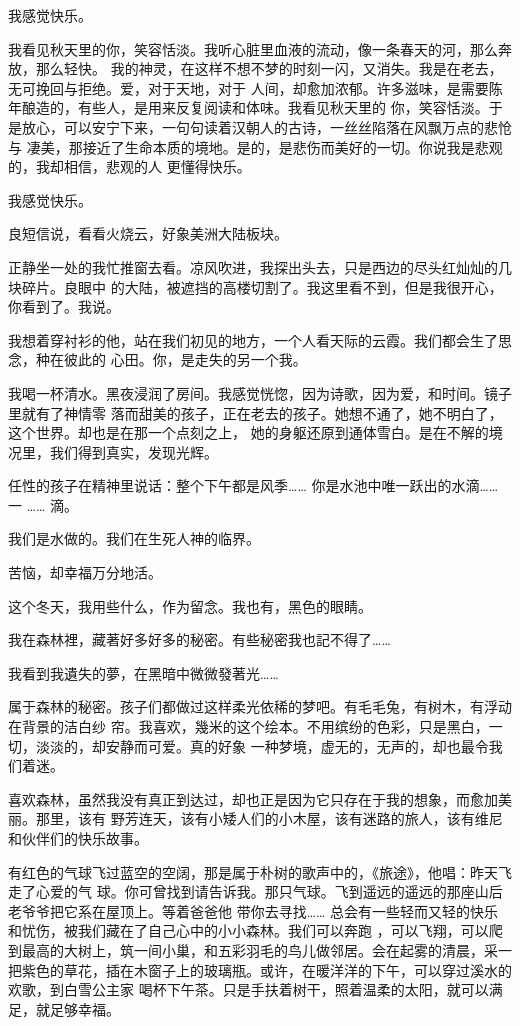 \documentclass[12pt,a4paper]{article}
\begin{document}
		我感觉快乐。

		我看见秋天里的你，笑容恬淡。我听心脏里血液的流动，像一条春天的河，那么奔放，那么轻快。
	我的神灵，在这样不想不梦的时刻一闪，又消失。我是在老去，无可挽回与拒绝。爱，对于天地，对于
	人间，却愈加浓郁。许多滋味，是需要陈年酿造的，有些人，是用来反复阅读和体味。我看见秋天里的
	你，笑容恬淡。于是放心，可以安宁下来，一句句读着汉朝人的古诗，一丝丝陷落在风飘万点的悲怆与
	凄美，那接近了生命本质的境地。是的，是悲伤而美好的一切。你说我是悲观的，我却相信，悲观的人
	更懂得快乐。

		我感觉快乐。

		良短信说，看看火烧云，好象美洲大陆板块。

		正静坐一处的我忙推窗去看。凉风吹进，我探出头去，只是西边的尽头红灿灿的几块碎片。良眼中
	的大陆，被遮挡的高楼切割了。我这里看不到，但是我很开心，你看到了。我说。

		我想着穿衬衫的他，站在我们初见的地方，一个人看天际的云霞。我们都会生了思念，种在彼此的
	心田。你，是走失的另一个我。

		我喝一杯清水。黑夜浸润了房间。我感觉恍惚，因为诗歌，因为爱，和时间。镜子里就有了神情零
	落而甜美的孩子，正在老去的孩子。她想不通了，她不明白了，这个世界。却也是在那一个点刻之上，
	她的身躯还原到通体雪白。是在不解的境况里，我们得到真实，发现光辉。

		任性的孩子在精神里说话：整个下午都是风季…… 你是水池中唯一跃出的水滴…… 一 …… 滴。

		我们是水做的。我们在生死人神的临界。

		苦恼，却幸福万分地活。

		这个冬天，我用些什么，作为留念。我也有，黑色的眼睛。

	\endwriting



		我在森林裡，藏著好多好多的秘密。有些秘密我也記不得了……

		我看到我遺失的夢，在黑暗中微微發著光……


		属于森林的秘密。孩子们都做过这样柔光依稀的梦吧。有毛毛兔，有树木，有浮动在背景的洁白纱
	帘。我喜欢，幾米的这个绘本。不用缤纷的色彩，只是黑白，一切，淡淡的，却安静而可爱。真的好象
	一种梦境，虚无的，无声的，却也最令我们着迷。

		喜欢森林，虽然我没有真正到达过，却也正是因为它只存在于我的想象，而愈加美丽。那里，该有
	野芳连天，该有小矮人们的小木屋，该有迷路的旅人，该有维尼和伙伴们的快乐故事。

		有红色的气球飞过蓝空的空阔，那是属于朴树的歌声中的，《旅途》，他唱：昨天飞走了心爱的气
	球。你可曾找到请告诉我。那只气球。飞到遥远的遥远的那座山后老爷爷把它系在屋顶上。等着爸爸他
	带你去寻找…… 总会有一些轻而又轻的快乐和忧伤，被我们藏在了自己心中的小小森林。我们可以奔跑
	，可以飞翔，可以爬到最高的大树上，筑一间小巢，和五彩羽毛的鸟儿做邻居。会在起雾的清晨，采一
	把紫色的草花，插在木窗子上的玻璃瓶。或许，在暖洋洋的下午，可以穿过溪水的欢歌，到白雪公主家
	喝杯下午茶。只是手扶着树干，照着温柔的太阳，就可以满足，就足够幸福。
\end{document}
